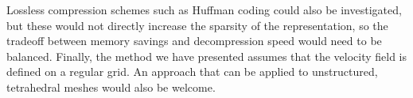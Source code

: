 Lossless compression schemes such as Huffman coding could also be investigated, but these would not directly increase the sparsity of the representation, so the tradeoff between memory savings and decompression speed would need to be balanced. Finally, the method we have presented assumes that the velocity field is defined on a regular grid. An approach that can be applied to unstructured, tetrahedral meshes \cite{Liu:2015:MVF,Stanton:2013} would also be welcome.
















